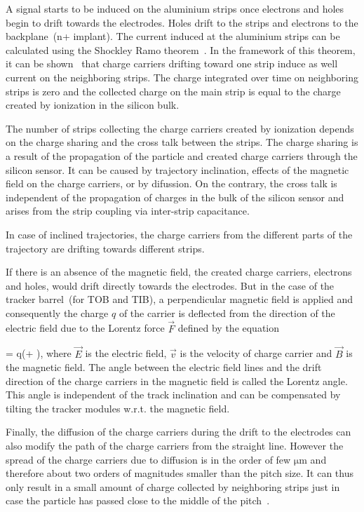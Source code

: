 A signal starts to be induced on the aluminium strips once electrons and holes begin to drift towards the electrodes. Holes drift to the strips and electrons to the backplane~(n+ implant). The current induced at the aluminium strips can be calculated using the Shockley Ramo theorem~\cite{doi:10.1063/1.1710367,Ramo:1939vr}. In the framework of this theorem, it can be shown~\cite{Bloch:2007zza} that charge carriers drifting toward one strip induce as well current on the neighboring strips. The charge integrated over time on neighboring strips is zero and the collected charge on the main strip is equal to the charge created by ionization in the silicon bulk.

The number of strips collecting the charge carriers created by ionization depends on the charge sharing and the cross talk between the strips. The charge sharing is a result of the propagation of the particle and created charge carriers through the silicon sensor. It can be caused by trajectory inclination, effects of the magnetic field on the charge carriers, or by difussion. On the contrary, the cross talk is independent of the propagation of charges in the bulk of the silicon sensor and arises from the strip coupling via inter-strip capacitance.  

In case of inclined trajectories, the charge carriers from the different parts of the trajectory are drifting towards different strips. 

If there is an absence of the magnetic field, the created charge carriers, electrons and holes, would drift directly towards the electrodes. But in the case of the tracker barrel~(for TOB and TIB), a perpendicular magnetic field is applied  and consequently  the charge $q$ of the carrier is deflected from the direction of the electric field due to the Lorentz force $\vec{F}$ defined by the equation

{
   =  q(+ \times {}),
}
where $\vec{E}$ is the electric field, $\vec{v}$ is the velocity of charge carrier and $\vec{B}$ is the magnetic field. The angle between the electric field lines and the drift direction of the charge carriers in the magnetic field is called the Lorentz angle. This angle is independent of the track inclination and can be compensated by tilting the tracker modules w.r.t. the magnetic field.

Finally, the diffusion of the charge carriers during the drift to the electrodes can also modify the path of the charge carriers from the straight line. However the spread of the charge carriers due to diffusion is in  the order of few $\mathrm{\mu m}$ and therefore about two orders of magnitudes smaller than the pitch size. It can thus only result in a small amount of charge collected by neighboring strips just in case the particle has passed close to the middle of the pitch~\cite{Bloch:2007zza}.


